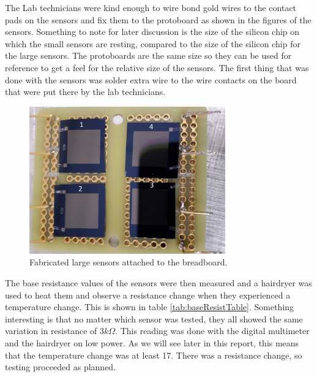 \documentclass[12pt,a4paper]{report}
\begin{document}
The Lab technicians were kind enough to wire bond gold wires to the contact pads on the sensors and fix them to the protoboard as shown in the figures of the sensors. Something to note for later discussion is the size of the silicon chip on which the small sensors are resting, compared to the size of the silicon chip for the large sensors. The protoboards are the same size so they can be used for reference to get a feel for the relative size of the sensors. The first thing that was done with the sensors was solder extra wire to the wire contacts on the board that were put there by the lab technicians.



\begin{figure}[h!]
    \centering
    \includegraphics[height = 2.5in]{Images/LargeRes.jpg}
    \caption{Fabricated large sensors attached to the breadboard.}
    \label{fig:LargeRes}
\end{figure}

The base resistance values of the sensors were then measured and a hairdryer was used to heat them and observe a resistance change when they experienced a temperature change. This is shown in table \ref{tab:baseResistTable}. Something interesting is that no matter which sensor was tested, they all showed the same variation in resistance of $3k\Omega$. This reading was done with the digital multimeter and the hairdryer on low power. As we will see later in this report, this means that the temperature change was at least 17\textcelsius{}. There was a resistance change, so testing proceeded as planned.
\end{document}
